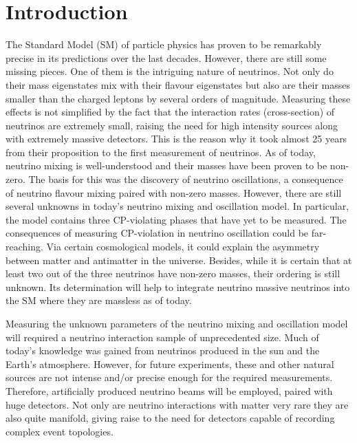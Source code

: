 \chapter{Introduction}
\label{chap:introduction}

The Standard Model (SM) of particle physics has proven to be remarkably precise in its predictions over the last decades.
However, there are still some missing pieces.
One of them is the intriguing nature of neutrinos.
Not only do their mass eigenstates mix with their flavour eigenstates but also are their masses smaller than the charged leptons by several orders of magnitude.
Measuring these effects is not simplified by the fact that the interaction rates (cross-section) of neutrinos are extremely small, raising the need for high intensity sources along with extremely massive detectors.
This is the reason why it took almost \num{25} years from their proposition to the first measurement of neutrinos.
As of today, neutrino mixing is well-understood and their masses have been proven to be non-zero.
The basis for this was the discovery of neutrino oscillations, a consequence of neutrino flavour mixing paired with non-zero masses.
However, there are still several unknowns in today's neutrino mixing and oscillation model.
In particular, the model contains three CP-violating phases that have yet to be measured.
The consequences of measuring CP-violation in neutrino oscillation could be far-reaching.
Via certain cosmological models, it could explain the asymmetry between matter and antimatter in the universe.
Besides, while it is certain that at least two out of the three neutrinos have non-zero masses, their ordering is still unknown.
Its determination will help to integrate neutrino massive neutrinos into the SM where they are massless as of today.

Measuring the unknown parameters of the neutrino mixing and oscillation model will required a neutrino interaction sample of unprecedented size.
Much of today's knowledge was gained from neutrinos produced in the sun and the Earth's atmosphere.
However, for future experiments, these and other natural sources are not intense and/or precise enough for the required measurements.
Therefore, artificially produced neutrino beams will be employed, paired with huge detectors.
Not only are neutrino interactions with matter very rare they are also quite manifold, giving raise to the need for detectors capable of recording complex event topologies.

